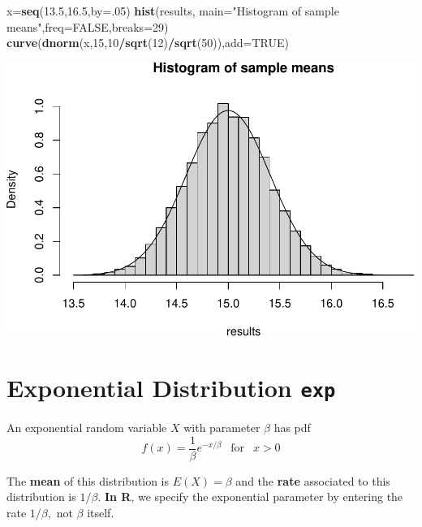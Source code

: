 \documentclass[
]{book}
\newenvironment{Shaded}{\begin{snugshade}}{\end{snugshade}}
\newcommand{\AttributeTok}[1]{\textcolor[rgb]{0.13,0.29,0.53}{#1}}
\newcommand{\ConstantTok}[1]{\textcolor[rgb]{0.56,0.35,0.01}{#1}}
\newcommand{\DecValTok}[1]{\textcolor[rgb]{0.00,0.00,0.81}{#1}}
\newcommand{\FloatTok}[1]{\textcolor[rgb]{0.00,0.00,0.81}{#1}}
\newcommand{\FunctionTok}[1]{\textcolor[rgb]{0.13,0.29,0.53}{\textbf{#1}}}
\newcommand{\NormalTok}[1]{#1}
\newcommand{\OtherTok}[1]{\textcolor[rgb]{0.56,0.35,0.01}{#1}}
\newcommand{\SpecialCharTok}[1]{\textcolor[rgb]{0.81,0.36,0.00}{\textbf{#1}}}
\newcommand{\StringTok}[1]{\textcolor[rgb]{0.31,0.60,0.02}{#1}}
\theoremstyle{definition}
\theoremstyle{definition}
\theoremstyle{definition}
\theoremstyle{definition}
\theoremstyle{remark}
\begin{document}
\begin{Shaded}
\begin{Highlighting}[]
\NormalTok{x}\OtherTok{=}\FunctionTok{seq}\NormalTok{(}\FloatTok{13.5}\NormalTok{,}\FloatTok{16.5}\NormalTok{,}\AttributeTok{by=}\NormalTok{.}\DecValTok{05}\NormalTok{)}
\FunctionTok{hist}\NormalTok{(results, }\AttributeTok{main=}\StringTok{"Histogram of sample means"}\NormalTok{,}\AttributeTok{freq=}\ConstantTok{FALSE}\NormalTok{,}\AttributeTok{breaks=}\DecValTok{29}\NormalTok{)}
\FunctionTok{curve}\NormalTok{(}\FunctionTok{dnorm}\NormalTok{(x,}\DecValTok{15}\NormalTok{,}\DecValTok{10}\SpecialCharTok{/}\FunctionTok{sqrt}\NormalTok{(}\DecValTok{12}\NormalTok{)}\SpecialCharTok{/}\FunctionTok{sqrt}\NormalTok{(}\DecValTok{50}\NormalTok{)),}\AttributeTok{add=}\ConstantTok{TRUE}\NormalTok{)}
\end{Highlighting}
\end{Shaded}

\includegraphics{math340-notes_files/figure-latex/unnamed-chunk-200-1.pdf}

\section{\texorpdfstring{Exponential Distribution \texttt{exp}}{Exponential Distribution exp}}\label{expR}

An exponential random variable \(X\) with parameter \(\beta\) has pdf \[f(x) = \frac{1}{\beta}e^{-x/\beta} ~~\text{ for }~~ x > 0\]

The \textbf{mean} of this distribution is \(E(X) = \beta\) and the \textbf{rate} associated to this distribution is \(1/\beta\). \textbf{In R}, we specify the exponential parameter by entering the rate \(1/\beta,\) not \(\beta\) itself.
\end{document}
